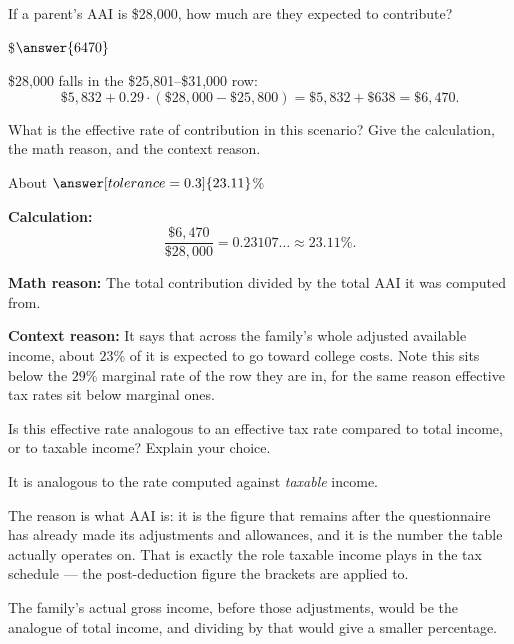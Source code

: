 \documentclass[12pt]{ximera}
\begin{document}
\begin{problem}
If a parent's AAI is \$28,000, how much are they expected to contribute?

\$$\answer{6470}$

\begin{solution}
\$28,000 falls in the \$25,801--\$31,000 row:
\[
\$5{,}832 + 0.29 \cdot (\$28{,}000 - \$25{,}800) = \$5{,}832 + \$638 = \$6{,}470.
\]
\end{solution}
\end{problem}

\begin{problem}
What is the effective rate of contribution in this scenario? Give the calculation, the
math reason, and the context reason.

About $\answer[tolerance=0.3]{23.11}$\%

\begin{freeResponse}
\end{freeResponse}

\begin{solution}
\textbf{Calculation:}
\[
\frac{\$6{,}470}{\$28{,}000} = 0.23107\ldots \approx 23.11\%.
\]

\textbf{Math reason:} The total contribution divided by the total AAI it was computed
from.

\textbf{Context reason:} It says that across the family's whole adjusted available
income, about $23\%$ of it is expected to go toward college costs. Note this sits below
the $29\%$ marginal rate of the row they are in, for the same reason effective tax
rates sit below marginal ones.
\end{solution}
\end{problem}

\begin{problem}
Is this effective rate analogous to an effective tax rate compared to total income, or
to taxable income? Explain your choice.

\begin{multipleChoice}
\end{multipleChoice}

\begin{freeResponse}
\end{freeResponse}

\begin{solution}
It is analogous to the rate computed against \emph{taxable} income.

The reason is what AAI is: it is the figure that remains after the questionnaire has
already made its adjustments and allowances, and it is the number the table actually
operates on. That is exactly the role taxable income plays in the tax schedule --- the
post-deduction figure the brackets are applied to.

The family's actual gross income, before those adjustments, would be the analogue of
total income, and dividing by that would give a smaller percentage.
\end{solution}
\end{problem}
\end{document}
